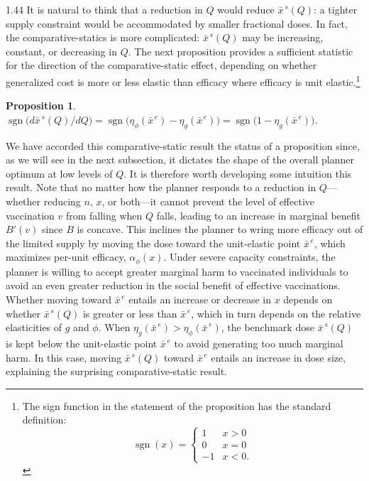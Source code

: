 \documentclass[12pt]{article}
\DeclareMathOperator*{\sgn}{sgn}
\newcommand{\efficacy}{\phi}
\newcommand{\general}{g}
\newcommand{\benefit}{B}
\newcommand{\xshortbar}{\bar{x}^{\,s}}
\newcommand{\xunitbar}{\bar{x}^{\,e}}
\newcommand{\elasticity}[1]{\eta_{#1}}
\newcommand{\perunit}[1]{\alpha_{#1}}
\newtheorem{proposition}{Proposition}
\begin{document}
\begin{spacing}{1.44}
It is natural to think that a reduction in $Q$ would reduce
$\xshortbar\!(Q)$: a tighter supply constraint would be accommodated
by smaller fractional doses. In fact, the comparative-statics is more
complicated: $\xshortbar\!(Q)$ may be increasing, constant, or
decreasing in $Q$. The next proposition provides a sufficient
statistic for the direction of the comparative-static effect,
depending on whether generalized cost is more or less elastic than
efficacy where efficacy is unit elastic.\footnote{The sign function in
the statement of the proposition has the standard definition:
\[
\sgn(x) = \left\{ \begin{array}{cc}
1 & x > 0 \\[-2pt]
0 & x = 0 \\[-2pt]
-1 & x < 0.
\end{array}
\right. 
\]}
\begin{proposition}
\label{p:xshort}
\singlespace
$\sgn \bigl( d \xshortbar\!(Q) /d Q \bigr) = \sgn
\bigl( \elasticity{\efficacy}\!(\xunitbar) -
\elasticity{\general}\!(\xunitbar) \bigr) = \sgn \bigl( 1 -
\elasticity{\general}\!(\xunitbar) \bigr)$.
\end{proposition}

We have accorded this comparative-static result the status of a
proposition since, as we will see in the next subsection, it dictates
the shape of the overall planner optimum at low levels of $Q$. It is
therefore worth developing some intuition this result. Note that no
matter how the planner responds to a reduction in $Q$---whether
reducing $n$, $x$, or both---it cannot prevent the level of effective
vaccination $v$ from falling when $Q$ falls, leading to an increase in
marginal benefit $\benefit' \! (v)$ since $\benefit$ is concave. This
inclines the planner to wring more efficacy out of the limited supply
by moving the dose toward the unit-elastic point $\xunitbar$, which
maximizes per-unit efficacy, $\perunit{\efficacy}\!(x)$. Under severe
capacity constraints, the planner is willing to accept greater
marginal harm to vaccinated individuals to avoid an even greater
reduction in the social benefit of effective vaccinations. Whether
moving toward $\xunitbar$ entails an increase or decrease in $x$
depends on whether $\xshortbar\!(Q)$ is greater or less than
$\xunitbar$, which in turn depends on the relative elasticities of
$\general$ and $\efficacy$. When $\elasticity{\general}\!(\xunitbar) >
\elasticity{\efficacy}\!(\xunitbar)$, the benchmark dose
$\xshortbar\!(Q)$ is kept below the unit-elastic point $\xunitbar$ to
avoid generating too much marginal harm. In this case, moving
$\xshortbar\!(Q)$ toward $\xunitbar$ entails an increase in dose size,
explaining the surprising comparative-static result.


\end{spacing}
\end{document}
